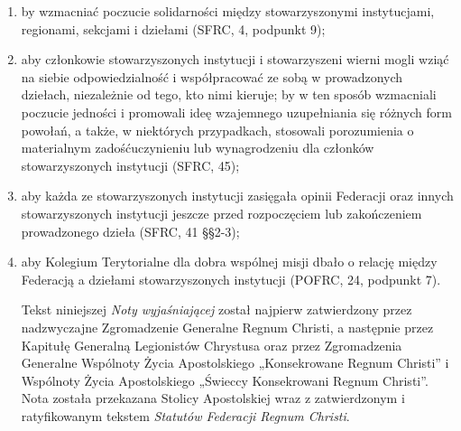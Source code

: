 \begin{enumerate}
\begin{enumerate}
\item by wzmacniać poczucie solidarności między stowarzyszonymi instytucjami, regionami, sekcjami i dziełami (SFRC, 4, podpunkt 9);


\item aby członkowie stowarzyszonych instytucji i stowarzyszeni wierni mogli wziąć na siebie odpowiedzialność i współpracować ze sobą w prowadzonych dziełach, niezależnie od tego, kto nimi kieruje; by w ten sposób wzmacniali poczucie jedności i promowali ideę wzajemnego uzupełniania się różnych form powołań, a także, w niektórych przypadkach, stosowali porozumienia o materialnym zadośćuczynieniu lub wynagrodzeniu dla członków stowarzyszonych instytucji (SFRC, 45);


\item aby każda ze stowarzyszonych instytucji zasięgała opinii Federacji oraz innych stowarzyszonych instytucji jeszcze przed rozpoczęciem lub zakończeniem prowadzonego dzieła (SFRC, 41 \S{}\S{}2-3);


\item aby Kolegium Terytorialne dla dobra wspólnej misji dbało o relację między Federacją a dziełami stowarzyszonych instytucji (POFRC, 24, podpunkt 7).
 
Tekst niniejszej {\em Noty wyjaśniającej} został najpierw zatwierdzony przez nadzwyczajne Zgromadzenie Generalne Regnum Christi, a następnie przez Kapitułę Generalną Legionistów Chrystusa oraz przez Zgromadzenia Generalne Wspólnoty Życia Apostolskiego „Konsekrowane Regnum Christi” i Wspólnoty Życia Apostolskiego „Świeccy Konsekrowani Regnum Christi”. Nota została przekazana Stolicy Apostolskiej wraz z zatwierdzonym i ratyfikowanym tekstem {\em Statutów Federacji Regnum Christi}.


\end{enumerate}


\end{enumerate}